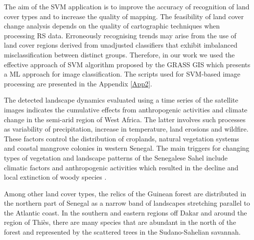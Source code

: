 \documentclass[earth,article,submit,pdftex,moreauthors]{Definitions/mdpi}
\begin{document}
{{The aim of the SVM application{ }is to improve the accuracy of recognition of land cover types and {to }increase the quality of{ }mapping. The feasibility of land cover change analysis depends on the quality of {cartographic techniques} when processing {RS} data. Erroneously recognising trends may arise from the use of land cover regions derived from unadjusted classifiers that exhibit imbalanced misclassification between distinct groups. Therefore, in our work we used the {effective} approach of {SVM} algorithm proposed by the GRASS GIS which presents a {ML} approach for image classification. {The} scripts used for SVM-based image processing are presented in the Appendix} \ref{App2}.

{The} detected {landscape dynamics evaluated using a time series of the satellite images indicates the cumulative effects from anthropogenic activities and }climate change {in the} semi-arid region of West Africa. {The latter involves such processes as }variability of precipitation, increase in temperature, land erosions and wildfire. These factors control the distribution of croplands, natural vegetation systems and coastal mangrove colonies in western Senegal. {The} main triggers for changing types of vegetation and landscape patterns of the Senegalese Sahel{ }include{ }climatic factors and anthropogenic activities which resulted in the decline and local extinction of woody species \cite{land3030770}. 

{Among other land cover types, the} relics of the Guinean forest are distributed in the northern part of Senegal as a narrow band of landscapes stretching parallel to the Atlantic coast. In the southern and eastern regions off Dakar and around the region of Thiès, there are many species that are abundant in the north of the forest and represented by the scattered trees in the Sudano-Sahelian savannah. 

}
\end{document}
